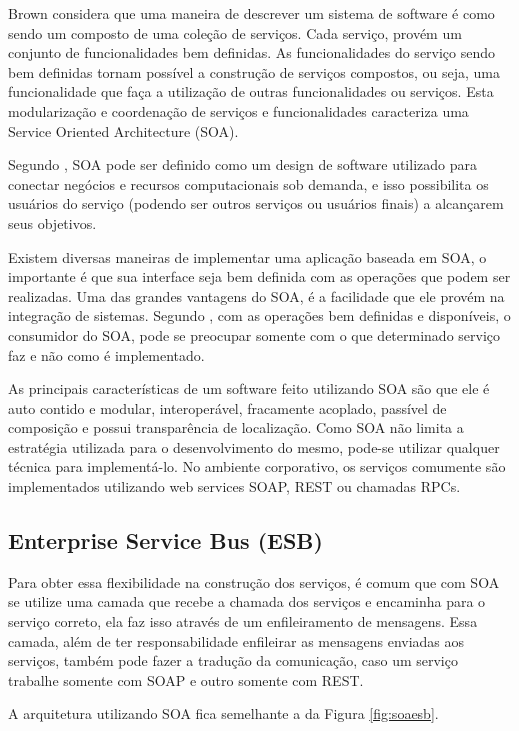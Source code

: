 Brown considera que uma maneira de descrever um sistema de software é como sendo um composto de 
uma coleção de serviços. Cada serviço, provém um conjunto de funcionalidades bem definidas. 
As funcionalidades do serviço sendo bem definidas tornam possível a construção de serviços 
compostos, ou seja, uma funcionalidade que faça a utilização de outras funcionalidades ou serviços. 
Esta modularização e coordenação de serviços e funcionalidades caracteriza uma 
Service Oriented Architecture (SOA).

Segundo \cite{valipour}, SOA pode ser definido como um design de software utilizado para 
conectar negócios e recursos computacionais sob demanda, e isso possibilita os usuários 
do serviço (podendo ser outros serviços ou usuários finais) a alcançarem seus objetivos. 

Existem diversas maneiras de implementar uma aplicação baseada em SOA, o importante é que 
sua interface seja bem definida com as operações que podem ser realizadas. 
Uma das grandes vantagens do SOA, é a facilidade que ele provém na integração de sistemas. 
Segundo \cite{valipour}, com as operações bem definidas e disponíveis, o consumidor do SOA, 
pode se preocupar somente com o que determinado serviço faz e não como é implementado.

As principais características de um software feito utilizando SOA são que ele é auto contido e 
modular, interoperável, fracamente acoplado, passível de composição e possui transparência de localização. 
Como SOA não limita a estratégia utilizada para o desenvolvimento do mesmo, pode-se utilizar qualquer 
técnica para implementá-lo. No ambiente corporativo, os serviços comumente são implementados 
utilizando web services SOAP, REST ou chamadas RPCs.

\subsection{Enterprise Service Bus (ESB)}

Para obter essa flexibilidade na construção dos serviços, é comum que com SOA se
utilize uma camada que recebe a chamada dos serviços e encaminha para o serviço correto,
ela faz isso através de um enfileiramento de mensagens.
Essa camada, além de ter responsabilidade enfileirar as mensagens enviadas aos serviços,
também pode fazer a tradução da comunicação, caso um serviço trabalhe somente com SOAP e outro somente
com REST.

A arquitetura utilizando SOA fica semelhante a da Figura \ref{fig:soaesb}.


